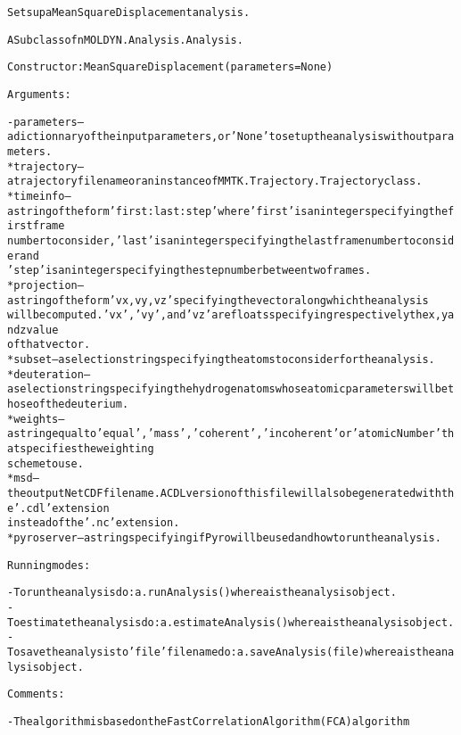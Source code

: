 \begin{alltt}
Sets up a Mean Square Displacement analysis.

A Subclass of nMOLDYN.Analysis.Analysis. 

Constructor: MeanSquareDisplacement({\textbar}parameters{\textbar} = None)

Arguments:

    - {\textbar}parameters{\textbar} -- a dictionnary of the input parameters, or 'None' to set up the analysis without parameters.
        * trajectory  -- a trajectory file name or an instance of MMTK.Trajectory.Trajectory class.
        * timeinfo    -- a string of the form 'first:last:step' where 'first' is an integer specifying the first frame 
                         number to consider, 'last' is an integer specifying the last frame number to consider and 
                         'step' is an integer specifying the step number between two frames.
        * projection  -- a string of the form 'vx,vy,vz' specifying the vector along which the analysis
                         will be computed. 'vx', 'vy', and 'vz' are floats specifying respectively the x, y and z value 
                         of that vector.
        * subset      -- a selection string specifying the atoms to consider for the analysis.
        * deuteration -- a selection string specifying the hydrogen atoms whose atomic parameters will be those of the deuterium.
        * weights     -- a string equal to 'equal', 'mass', 'coherent' , 'incoherent' or 'atomicNumber' that specifies the weighting
                         scheme to use.
        * msd         -- the output NetCDF file name. A CDL version of this file will also be generated with the '.cdl' extension
                         instead of the '.nc' extension.
        * pyroserver  -- a string specifying if Pyro will be used and how to run the analysis.
    
Running modes:

    - To run the analysis do: a.runAnalysis() where a is the analysis object.
    - To estimate the analysis do: a.estimateAnalysis() where a is the analysis object.
    - To save the analysis to 'file' file name do: a.saveAnalysis(file) where a is the analysis object.
    
Comments:

    - The algorithm is based on the Fast Correlation Algorithm (FCA) algorithm
\end{alltt}



